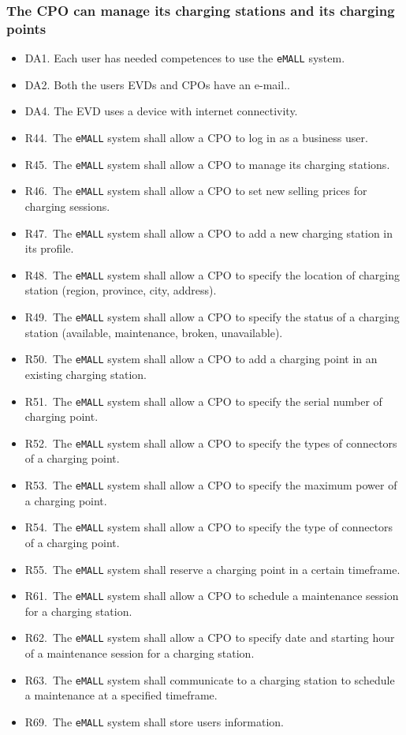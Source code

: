 \subsubsection{The CPO can manage its charging stations and its charging points}
\begin{itemize}
    \item DA1. Each user has needed competences to use the \verb|eMALL| system.
    \item DA2. Both the users EVDs and CPOs have an e-mail..
    \item DA4. The EVD uses a device with internet connectivity.
    \item R44.\ The \verb|eMALL| system shall allow a CPO to log in as a business user.
    \item R45.\ The \verb|eMALL| system shall allow a CPO to manage its charging stations.
    \item R46.\ The \verb|eMALL| system shall allow a CPO to set new selling prices for charging sessions.
    \item R47.\ The \verb|eMALL| system shall allow a CPO to add a new charging station in its profile.
    \item R48.\ The \verb|eMALL| system shall allow a CPO to specify the location of charging station
    (region, province, city, address).
    \item R49.\ The \verb|eMALL| system shall allow a CPO to specify the status of a charging station
    (available, maintenance, broken, unavailable).
    \item R50.\ The \verb|eMALL| system shall allow a CPO to add a charging point in an existing
    charging station.
    \item R51.\ The \verb|eMALL| system shall allow a CPO to specify the serial number of charging
    point.
    \item R52.\ The \verb|eMALL| system shall allow a CPO to specify the types of connectors of a
    charging point.
    \item R53.\ The \verb|eMALL| system shall allow a CPO to specify the maximum power of a charging
    point.
    \item R54.\ The \verb|eMALL| system shall allow a CPO to specify the type of connectors of a
    charging point.
    \item R55.\ The \verb|eMALL| system shall reserve a charging point in a certain timeframe.
    \item R61.\ The \verb|eMALL| system shall allow a CPO to schedule a maintenance session for a
    charging station.
    \item R62.\ The \verb|eMALL| system shall allow a CPO to specify date and starting hour of a
    maintenance session for a charging station.
    \item R63.\ The \verb|eMALL| system shall communicate to a charging station to schedule a maintenance at a specified timeframe.
    \item R69.\ The \verb|eMALL| system shall store users information.
\end{itemize}

